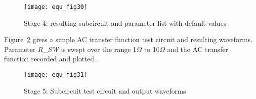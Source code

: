 \begin{figure}[h]
  \centering
  \texttt{[image: equ\_fig30]}
  \caption{Stage 4: resulting subcircuit and parameter list with default values} 
  \label{fig:equ_30}
\end{figure} 
\FloatBarrier

\newpage


Figure~\ref{fig:equ_31} gives a simple AC transfer function test
circuit and resulting waveforms.  Parameter \textit{R\_SW} is swept
over the range 1$\Omega$ to 10$\Omega$ and the AC transfer function
recorded and plotted.

\begin{figure}[h]
  \centering
  \texttt{[image: equ\_fig31]}
  \caption{Stage 5: Subcircuit test circuit and output waveforms} 
  \label{fig:equ_31}
\end{figure} 
